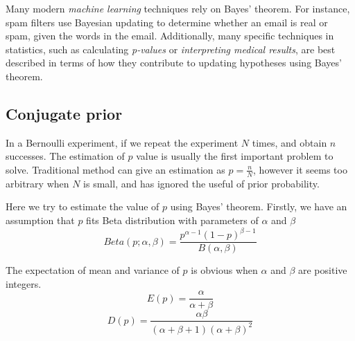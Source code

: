 \documentclass[a4paper]{article}
\begin{document}
Many modern \emph{machine learning} techniques rely on Bayes' theorem. For instance, spam filters use Bayesian updating to determine whether an email is real or spam, given the words in the email. Additionally, many specific techniques in statistics, such as calculating \emph{p-values} or \emph{interpreting medical results}, are best described in terms of how they contribute to updating hypotheses using Bayes' theorem.

\subsection{Conjugate prior}

In a Bernoulli experiment, if we repeat the experiment $N$ times, and obtain $n$ successes.
The estimation of $p$ value is usually the first important problem to solve.
Traditional method can give an estimation as $\hat{p}=\frac{n}{N}$, however it seems too arbitrary when $N$ is small, and has ignored the useful of prior probability.

Here we try to estimate the value of $p$ using Bayes' theorem.
Firstly, we have an assumption that $p$ fits Beta distribution with parameters of $\alpha$ and $\beta$
\begin{equation}
    Beta(p; \alpha, \beta) = \frac{p^{\alpha-1} (1-p)^{\beta-1}}{B(\alpha, \beta)}
\end{equation}

The expectation of mean and variance of $p$ is obvious when $\alpha$ and $\beta$ are positive integers.
\begin{equation}
    E(p) = \frac{\alpha}{\alpha+\beta}
\end{equation}
\begin{equation}
    D(p) = \frac{\alpha\beta}{(\alpha+\beta+1)(\alpha+\beta)^2}
    \label{eq: variance of Beta function}
\end{equation}
\end{document}
